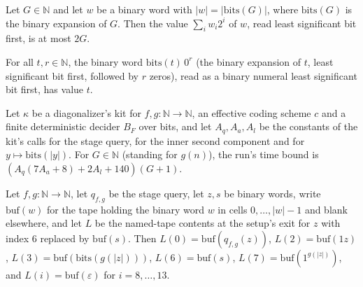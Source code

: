 \begin{theorem}
\end{theorem}

\begin{theorem}
\label{Turing.NTimeDiag.dz_budget_le}
\leanok
{}
Let $G \in \mathbb{N}$ and let $w$ be a binary word with $|w| = |\mathrm{bits}(G)|$, where $\mathrm{bits}(G)$ is the binary expansion of $G$. Then the value $\sum_i w_i 2^i$ of $w$, read least significant bit first, is at most $2G$.
\end{theorem}

\begin{theorem}
\label{Turing.NTimeDiag.dz_padded_value}
\leanok
{}
For all $t, r \in \mathbb{N}$, the binary word $\mathrm{bits}(t)\,0^r$ (the binary expansion of $t$, least significant bit first, followed by $r$ zeros), read as a binary numeral least significant bit first, has value $t$.
\end{theorem}

\begin{definition}
\label{Turing.NTimeDiag.dzQB}
\leanok
{}
Let $\kappa$ be a diagonalizer's kit for $f, g : \mathbb{N} \to \mathbb{N}$, an effective coding scheme $c$ and a finite deterministic decider $B_F$ over bits, and let $A_q, A_a, A_l$ be the constants of the kit's calls for the stage query, for the inner second component and for $y \mapsto \mathrm{bits}(|y|)$. For $G \in \mathbb{N}$ (standing for $g(n)$), the run's time bound is $(A_q(7A_a + 8) + 2A_l + 140)(G + 1)$.
\end{definition}

\begin{theorem}
\label{Turing.NTimeDiag.dz_entry_vals}
\leanok
{}
Let $f, g : \mathbb{N} \to \mathbb{N}$, let $q_{f,g}$ be the stage query, let $z, s$ be binary words, write $\mathrm{buf}(w)$ for the tape holding the binary word $w$ in cells $0, \dots, |w| - 1$ and blank elsewhere, and let $L$ be the named-tape contents at the setup's exit for $z$ with index $6$ replaced by $\mathrm{buf}(s)$. Then $L(0) = \mathrm{buf}(q_{f,g}(z))$, $L(2) = \mathrm{buf}(1z)$, $L(3) = \mathrm{buf}(\mathrm{bits}(g(|z|)))$, $L(6) = \mathrm{buf}(s)$, $L(7) = \mathrm{buf}(1^{g(|z|)})$, and $L(i) = \mathrm{buf}(\varepsilon)$ for $i = 8, \dots, 13$.
\end{theorem}

